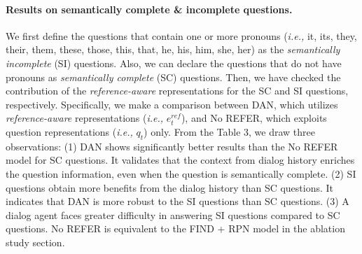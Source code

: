 \documentclass[11pt,a4paper]{article}
\begin{document}
\paragraph{Results on semantically complete \& incomplete questions.} We first define the questions that contain one or more pronouns ({\it i.e.,} it, its, they, their, them, these, those, this, that, he, his, him, she, her) as the {\it semantically incomplete} (SI) questions. Also, we can declare the questions that do not have pronouns as {\it semantically complete} (SC) questions. Then, we have checked the contribution of the {\it{reference-aware}} representations for the SC and SI questions, respectively. Specifically, we make a comparison between DAN, which utilizes {\it reference-aware} representations ({\it i.e.,} $e^{ref}_t$), and No REFER, which exploits question representations ({\it i.e.,} $q_t$) only. From the Table 3, we draw three observations: (1) DAN shows significantly better results than the No REFER model for SC questions. It validates that the context from dialog history enriches the question information, even when the question is semantically complete. (2) SI questions obtain more benefits from the dialog history than SC questions. It indicates that DAN is more robust to the SI questions than SC questions. (3) A dialog agent faces greater difficulty in answering SI questions compared to SC questions. No REFER is equivalent to the FIND + RPN model in the ablation study section. 
\begin{table}
\centering
{}
\caption{VisDial v1.0 validation performance on the semantically complete (SC) and incomplete (SI) questions. We observe that SI questions obtain more benefits from the dialog history than SC questions.}
\label{tab:t4}
\end{table}
\end{document}
